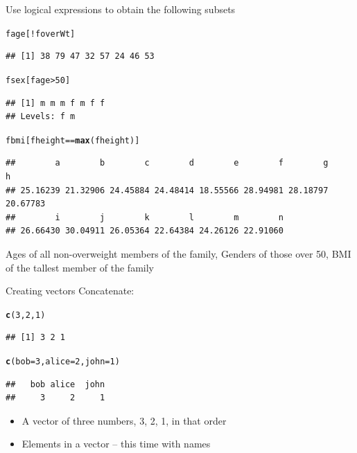 \documentclass{beamer}\usepackage[]{graphicx}\usepackage[]{color}
\makeatletter
\newcommand{\hlnum}[1]{\textcolor[rgb]{0.686,0.059,0.569}{#1}}%
\newcommand{\hlopt}[1]{\textcolor[rgb]{0,0,0}{#1}}%
\newcommand{\hlstd}[1]{\textcolor[rgb]{0.345,0.345,0.345}{#1}}%
\newcommand{\hlkwc}[1]{\textcolor[rgb]{0.333,0.667,0.333}{#1}}%
\newcommand{\hlkwd}[1]{\textcolor[rgb]{0.737,0.353,0.396}{\textbf{#1}}}%
\newenvironment{kframe}{%
 \def\at@end@of@kframe{}%
 \ifinner\ifhmode%
  \def\at@end@of@kframe{\end{minipage}}%
  \begin{minipage}{\columnwidth}%
 \fi\fi%
 \def\FrameCommand##1{\hskip\@totalleftmargin \hskip-\fboxsep
 \colorbox{shadecolor}{##1}\hskip-\fboxsep
     \hskip-\linewidth \hskip-\@totalleftmargin \hskip\columnwidth}%
 \MakeFramed {\advance\hsize-\width
   \@totalleftmargin\z@ \linewidth\hsize
   \@setminipage}}%
 {\par\unskip\endMakeFramed%
 \at@end@of@kframe}
\newenvironment{knitrout}{}{} %
\renewenvironment{knitrout}{\begin{singlespace}}{\end{singlespace}}
\theoremstyle{mystyle}
\makeatother
\begin{document}
\begin{frame}[fragile]{Use logical expressions to obtain the following subsets}
\begin{knitrout}
\color{fgcolor}\begin{kframe}
\begin{alltt}
\hlstd{fage[} \hlopt{!}\hlstd{foverWt ]}
\end{alltt}
\begin{verbatim}
## [1] 38 79 47 32 57 24 46 53
\end{verbatim}
\begin{alltt}
\hlstd{fsex[ fage} \hlopt{>} \hlnum{50} \hlstd{]}
\end{alltt}
\begin{verbatim}
## [1] m m m f m f f
## Levels: f m
\end{verbatim}
\begin{alltt}
\hlstd{fbmi[ fheight} \hlopt{==} \hlkwd{max}\hlstd{(fheight) ]}
\end{alltt}
\begin{verbatim}
##        a        b        c        d        e        f        g        h 
## 25.16239 21.32906 24.45884 24.48414 18.55566 28.94981 28.18797 20.67783 
##        i        j        k        l        m        n 
## 26.66430 30.04911 26.05364 22.64384 24.26126 22.91060
\end{verbatim}
\end{kframe}
\end{knitrout}
Ages of all non-overweight members of the family, Genders of those over 50, BMI of the tallest member of the family
\end{frame}

\begin{frame}[fragile]{Creating vectors}
Concatenate:
\begin{knitrout}
\color{fgcolor}\begin{kframe}
\begin{alltt}
\hlkwd{c}\hlstd{(}\hlnum{3}\hlstd{,} \hlnum{2}\hlstd{,} \hlnum{1}\hlstd{)}
\end{alltt}
\begin{verbatim}
## [1] 3 2 1
\end{verbatim}
\begin{alltt}
\hlkwd{c}\hlstd{(}\hlkwc{bob} \hlstd{=}\hlnum{3}\hlstd{,} \hlkwc{alice} \hlstd{=} \hlnum{2}\hlstd{,} \hlkwc{john} \hlstd{=} \hlnum{1}\hlstd{)}
\end{alltt}
\begin{verbatim}
##   bob alice  john 
##     3     2     1
\end{verbatim}
\end{kframe}
\end{knitrout}
\begin{itemize}
\item A vector of three numbers, 3, 2, 1, in that order
\item Elements in a vector – this time with names
\end{itemize}
\end{frame}
\end{document}
